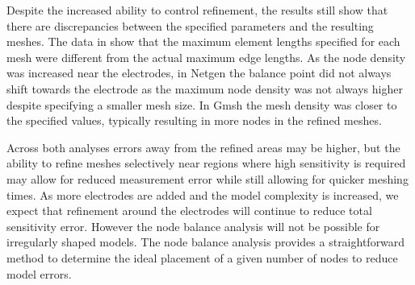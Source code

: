 Despite the increased ability to control refinement, the results still show that there are
discrepancies between the specified parameters and the resulting meshes. The data in 
 show that the maximum element lengths specified for each mesh 
were different from the actual maximum edge lengths. As the node density was increased
near the electrodes, in Netgen the balance point did not always shift towards the electrode
as the maximum node density was not always higher despite specifying a smaller mesh size.
In Gmsh the mesh density was closer to the specified values, typically resulting in more
nodes in the refined meshes. 

Across both analyses errors away from the refined areas may be higher,
but the ability to refine meshes selectively near regions where high sensitivity 
is required may allow for reduced measurement error while still allowing for quicker 
meshing times.
As more electrodes are added and the model complexity is increased, we expect that 
refinement around the electrodes will continue to reduce total sensitivity error. However 
the node balance analysis will not be possible for irregularly shaped models.
The node balance analysis provides a straightforward method to determine the 
ideal placement of a given number of nodes to reduce model errors.


%

